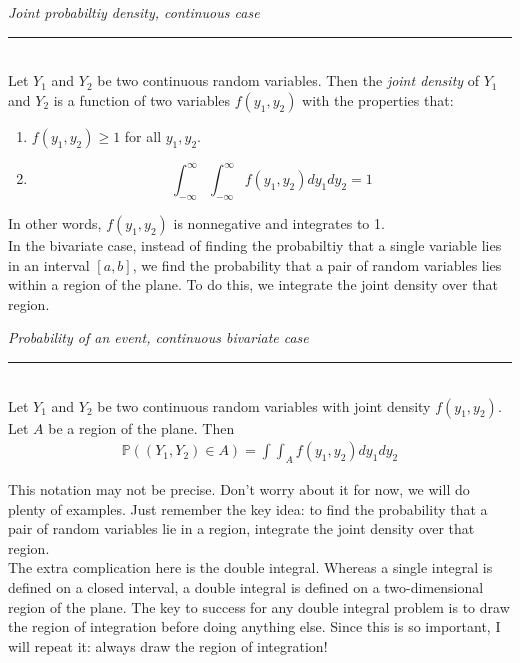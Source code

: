 \documentclass[12pt]{article}
\theoremstyle{definition}
\theoremstyle{remark}
\def\P{{\mathbb P}}
\begin{document}
\begin{framed}
\emph{Joint probabiltiy density, continuous case}\\
  \rule{\dimexpr{}\fboxrule}{.1pt} \\
Let $Y_1$ and $Y_2$ be two continuous random variables. Then the \emph{joint density} of $Y_1$ and $Y_2$ is a function of two variables $f(y_1, y_2)$ with the properties that:
\begin{enumerate}
\item $f(y_1, y_2) \geq 1$ for all $y_1, y_2$.
\item \[
\int_{-\infty}^\infty \int_{-\infty}^\infty f(y_1, y_2) dy_1 dy_2 = 1
\]
\end{enumerate}
\end{framed}
In other words, $f(y_1, y_2)$ is nonnegative and integrates to 1.\\

In the bivariate case, instead of finding the probabiltiy that a single variable lies in an interval $[a, b]$, we find the probability that a pair of random variables lies within a region of the plane. To do this, we integrate the joint density over that region.

\begin{framed}
\emph{Probability of an event, continuous bivariate case}\\
  \rule{\dimexpr{}\fboxrule}{.1pt} \\
Let $Y_1$ and $Y_2$ be two continuous random variables with joint density $f(y_1, y_2)$. Let $A$ be a region of the plane. Then
\begin{align*}
\P((Y_1, Y_2) \in A) =  \int \int_A f(y_1, y_2) dy_1 dy_2
\end{align*}
\end{framed}
This notation may not be precise. Don't worry about it for now, we will do plenty of examples. Just remember the key idea: to find the probability that a pair of random variables lie in a region, integrate the joint density over that region.\\

The extra complication here is the double integral. Whereas a single integral is defined on a closed interval, a double integral is defined on a two-dimensional region of the plane. The key to success for any double integral problem is to draw the region of integration before doing anything else. Since this is so important, I will repeat it: always draw the region of integration!\\
\end{document}
